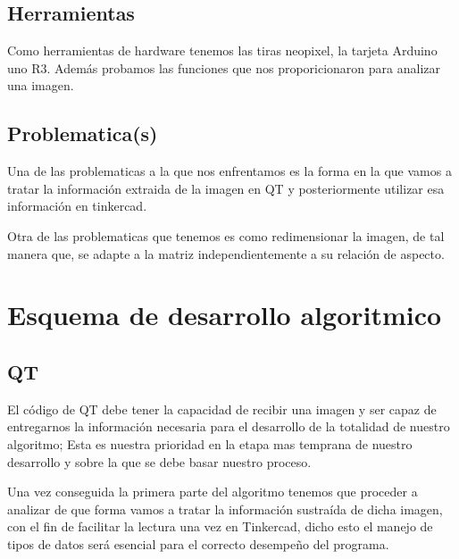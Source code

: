 \documentclass{article}
\begin{document}
    \begin{flushleft}
    \subsection{Herramientas}
    Como herramientas de hardware tenemos las tiras neopixel, la tarjeta Arduino uno R3. Además probamos las funciones que nos proporicionaron para analizar una imagen. 
    \end{flushleft}
    \vspace*{0.5cm}
    \begin{flushleft}
    \subsection{Problematica(s)}
     Una de las problematicas a la que nos enfrentamos es la forma en la que vamos a tratar la información extraida de la imagen en QT y posteriormente utilizar esa información en tinkercad.
     
     \vspace*{0.1cm}
     
     Otra de las problematicas que tenemos es como redimensionar la imagen, de tal manera que, se adapte a la matriz independientemente a su relación de aspecto.   
    \end{flushleft}
    \vspace*{2cm}

\newpage
    
\section{Esquema de desarrollo algoritmico}
\label{esquema}
    \begin{flushleft}
        
    \subsection{QT}
    El código de QT debe tener la capacidad de recibir una imagen y ser capaz de entregarnos la información necesaria para el desarrollo de la totalidad de nuestro algoritmo; Esta es nuestra prioridad en la etapa mas temprana de nuestro desarrollo y sobre la que se debe basar nuestro proceso.
    \end{flushleft}

    \begin{flushleft}
    Una vez conseguida la primera parte del algoritmo tenemos que proceder a analizar de que forma vamos a tratar la información sustraída de dicha imagen, con el fin de facilitar la lectura una vez en Tinkercad, dicho esto el manejo de tipos de datos será esencial para el correcto desempeño del programa.
    \end{flushleft}
    \vspace*{0.5cm}
    
\end{document}
